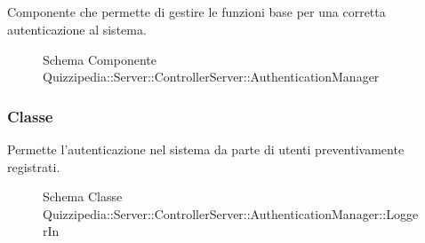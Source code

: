 \subsection{}
Componente che permette di gestire le funzioni base per una corretta autenticazione al sistema.
\begin{figure}[H]
\centering
\noindent{}
\caption[Schema Componente Quizzipedia::Server::ControllerServer::AuthenticationManager]{Schema Componente Quizzipedia::Server::ControllerServer::AuthenticationManager}
\end{figure}
\subsubsection{Classe }
Permette l'autenticazione nel sistema da parte di utenti preventivamente registrati.
\begin{figure}[H]
\centering
\noindent{}
\caption[Schema Classe LoggerIn]{Schema Classe Quizzipedia::Server::ControllerServer::AuthenticationManager::LoggerIn}
\end{figure}
